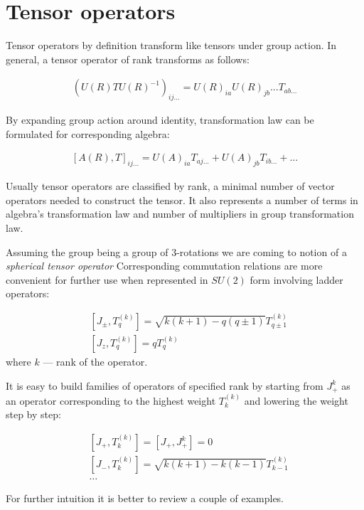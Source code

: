 \section{Tensor operators} \label{sec:app:tensor-op}
Tensor operators by definition transform like tensors under group action.
In general, a tensor operator of rank transforms as follows:

\begin{align}
    \left(U(R) T U(R)^{-1}\right)_{ij...}  = U(R)_{ia} U(R)_{jb} ... T_{ab...}
\end{align}

By expanding group action around identity, transformation law can be
formulated for corresponding algebra:

\begin{align}
    \left[A(R), T\right]_{ij...} = U(A)_{ia} T_{aj...} + U(A)_{jb} T_{ib...} + ...
\end{align}

Usually tensor operators are classified by rank, a minimal number of vector
operators needed to construct the tensor. It also represents a number of terms
in algebra's transformation law and number of multipliers in group transformation law. 

Assuming the group being a group of 3-rotations we are coming to notion of
a \textit{spherical tensor operator} Corresponding commutation relations are more
convenient for further use when represented in $SU(2)$ form involving ladder operators:

\begin{align}
        &\left[J_{\pm}, T^{(k)}_{q}\right] = \sqrt{k(k+1) - q(q\pm1)} T^{(k)}_{q\pm1} \\
        &\left[J_z, T^{(k)}_{q}\right] = q T_{q}^{(k)}
\end{align}
where $k$ — rank of the operator.

It is easy to build families of operators of specified rank by starting
from $J_{+}^k$ as an operator corresponding to the highest weight $T^{(k)}_k$
and lowering the weight step by step:

\begin{align}
        & \left[J_{+}, T^{(k)}_k\right] = \left[J_{+}, J_{+}^{k}\right] = 0 \\
        & \left[J_{-}, T^{(k)}_k\right] =  \sqrt{k(k+1)-k(k-1)} T^{(k)}_{k-1} \\
        & \dots
\end{align}

For further intuition it is better to review a couple of examples.

